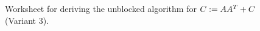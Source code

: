 \documentclass{article}
\begin{document}
\begin{figure}[tbp]

\begin{center}     %
\footnotesize      %
 
\worksheet         %
\end{center} 
 
 
\caption{ Worksheet for deriving the unblocked algorithm for 
$C := A A^T + C$ (Variant 3).} 
 
 
 
\label{FLA_Syrk_ln:ws_unb_var3} 
 
\end{figure} 




\renewcommand{\partitionings}{
  $
  A \rightarrow
  \FlaTwoByOne{A_{T}}
              {A_{B}}
  $
,
  $
  C \rightarrow
  \FlaTwoByTwo{C_{TL}}{C_{TR}}
              {C_{BL}}{C_{BR}}
  $
}

\renewcommand{\partitionsizes}{
$ A_{B} $ has $ 0 $ rows,
$ C_{BR} $ is $ 0 \times 0 $
}


\renewcommand{\repartitionings}{
$
  \FlaTwoByOne{ A_T }
              { A_B }
\rightarrow
  \FlaThreeByOneT{A_0}
                 {a_1^T}
                 {A_2}
$
,
$
  \FlaTwoByTwo{C_{TL}}{C_{TR}}
              {C_{BL}}{C_{BR}}
  \rightarrow
  \FlaThreeByThreeTL{C_{00}}{c_{01}}{C_{02}}
                    {c_{10}^T}{\gamma_{11}}{c_{12}^T}
                    {C_{20}}{c_{21}}{C_{22}}
$}

\renewcommand{\repartitionsizes}{
$ a_1 $ has $ 1 $ row,
  $ \gamma_{11} $ is $ 1 \times 1 $
}


\renewcommand{\moveboundaries}{
$
  \FlaTwoByOne{ A_T }
              { A_B }
\leftarrow
  \FlaThreeByOneB{A_0}
                 {a_1^T}
                 {A_2}
$
,
$
  \FlaTwoByTwo{C_{TL}}{C_{TR}}
              {C_{BL}}{C_{BR}}
  \leftarrow
  \FlaThreeByThreeBR{C_{00}}{c_{01}}{C_{02}}
                    {c_{10}^T}{\gamma_{11}}{c_{12}^T}
                    {C_{20}}{c_{21}}{C_{22}}
$}
\end{document}
